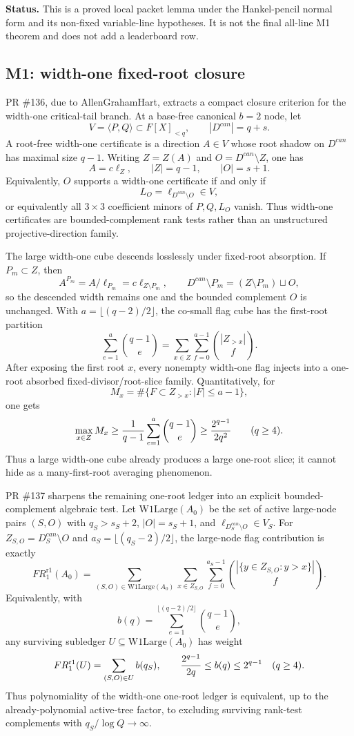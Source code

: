 \documentclass[11pt]{article}
\begin{document}
\textbf{Status.}  This is a proved local packet lemma under the Hankel-pencil
normal form and its non-fixed variable-line hypotheses.  It is not the final
all-line M1 theorem and does not add a leaderboard row.

\subsection{M1: width-one fixed-root closure}

PR \#136, due to AllenGrahamHart, extracts a compact closure criterion for the
width-one critical-tail branch.  At a base-free canonical \(b=2\) node, let
\[
  V=\langle P,Q\rangle\subset F[X]_{<q},\qquad |D^{can}|=q+s.
\]
A root-free width-one certificate is a direction \(A\in V\) whose root shadow
on \(D^{can}\) has maximal size \(q-1\).  Writing \(Z=Z(A)\) and
\(O=D^{can}\setminus Z\), one has
\[
  A=c\ell_Z,\qquad |Z|=q-1,\qquad |O|=s+1.
\]
Equivalently, \(O\) supports a width-one certificate if and only if
\[
  L_O=\ell_{D^{can}\setminus O}\in V,
\]
or equivalently all \(3\times3\) coefficient minors of \(P,Q,L_O\) vanish.
Thus width-one certificates are bounded-complement rank tests rather than an
unstructured projective-direction family.

The large width-one cube descends losslessly under fixed-root absorption.  If
\(P_m\subset Z\), then
\[
  A^{P_m}=A/\ell_{P_m}=c\ell_{Z\setminus P_m},\qquad
  D^{can}\setminus P_m=(Z\setminus P_m)\sqcup O,
\]
so the descended width remains one and the bounded complement \(O\) is
unchanged.  With \(a=\lfloor(q-2)/2\rfloor\), the co-small flag cube has the
first-root partition
\[
  \sum_{e=1}^a\binom{q-1}{e}
  =
  \sum_{x\in Z}\sum_{f=0}^{a-1}\binom{|Z_{>x}|}{f}.
\]
After exposing the first root \(x\), every nonempty width-one flag injects into
a one-root absorbed fixed-divisor/root-slice family.  Quantitatively, for
\[
  M_x=\#\{F\subset Z_{>x}: |F|\le a-1\},
\]
one gets
\[
  \max_{x\in Z}M_x
  \ge {1\over q-1}\sum_{e=1}^a\binom{q-1}{e}
  \ge {2^{q-1}\over 2q^2}\qquad(q\ge4).
\]
Thus a large width-one cube already produces a large one-root slice; it cannot
hide as a many-first-root averaging phenomenon.

PR \#137 sharpens the remaining one-root ledger into an explicit
bounded-complement algebraic test.  Let \(\mathrm{W1Large}(A_0)\) be the set of
active large-node pairs \((S,O)\) with \(q_S>s_S+2\), \(|O|=s_S+1\), and
\(\ell_{D_S^{can}\setminus O}\in V_S\).  For
\(Z_{S,O}=D_S^{can}\setminus O\) and \(a_S=\lfloor(q_S-2)/2\rfloor\), the
large-node flag contribution is exactly
\[
  FR^{\mathrm{r1}}_1(A_0)
  =
  \sum_{(S,O)\in \mathrm{W1Large}(A_0)}
  \sum_{x\in Z_{S,O}}
  \sum_{f=0}^{a_S-1}\binom{|\{y\in Z_{S,O}:y>x\}|}{f}.
\]
Equivalently, with
\[
  b(q)=\sum_{e=1}^{\lfloor(q-2)/2\rfloor}\binom{q-1}{e},
\]
any surviving subledger \(U\subseteq \mathrm{W1Large}(A_0)\) has weight
\[
  FR^{\mathrm{r1}}_1(U)=\sum_{(S,O)\in U} b(q_S),
  \qquad
  {2^{q-1}\over 2q}\le b(q)\le2^{q-1}\quad(q\ge4).
\]
Thus polynomiality of the width-one one-root ledger is equivalent, up to the
already-polynomial active-tree factor, to excluding surviving rank-test
complements with \(q_S/\log Q\to\infty\).
\end{document}
